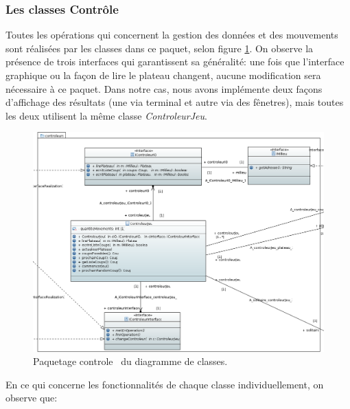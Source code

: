 \documentclass{article}
\begin{document}
\subsubsection {Les classes \og Contrôle \fg}
\label{sec:controle}

Toutes les opérations qui concernent la gestion des données et des mouvements
sont réalisées par les classes dans ce paquet, selon figure
\ref{fig:classes_controle}. On observe la présence de trois interfaces qui
garantissent sa généralité: une fois que l'interface graphique ou la façon de
lire le plateau changent, aucune modification sera nécessaire à ce paquet. Dans
notre cas, nous avons implémente deux façons d'affichage des résultats (une via
terminal et autre via des fênetres), mais toutes les deux utilisent la même
classe \textit{ControleurJeu}.

\begin{figure}[h]
\centering
\includegraphics[scale=0.45]{images/controle}
\caption{Paquetage \og controle \fg ~du diagramme de classes.}
\label{fig:classes_controle}
\end{figure}

En ce qui concerne les fonctionnalités de chaque classe individuellement, on
observe que:

\vspace{12pt}
\end{document}
